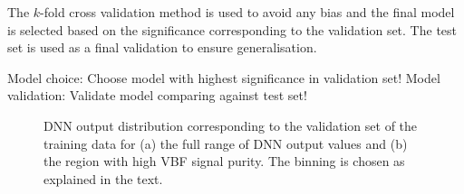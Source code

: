 The $k$-fold cross validation method is used to avoid any bias and the final model is selected based on the significance corresponding to the validation set. 
The test set is used as a final validation to ensure generalisation. 

Model choice: Choose model with highest significance in validation set!
Model validation: Validate model comparing against test set!

\captionsetup[subfloat]{captionskip=7pt} %
\begin{figure}[t]
    \caption{DNN output distribution corresponding to the validation set of the training data for (a) the full range of DNN output values and (b) the region with high VBF signal purity. The binning is chosen as explained in the text.}
    \label{fig:dnn-val-set}
\end{figure}



